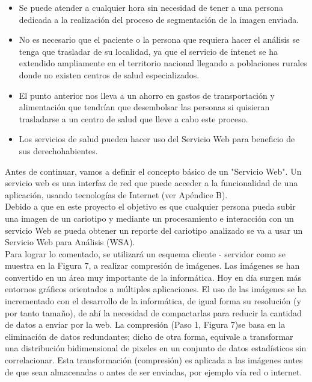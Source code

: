 \documentclass[12pt,letterpaper,titlepage]{article}
\begin{document}
\begin{itemize}
\begin{itemize}\itemsep=0pt
\item  Se puede atender a cualquier hora sin necesidad de tener a una persona dedicada a la realización del proceso de segmentación de la imagen enviada.\\
\item No es necesario que el paciente o la persona que requiera hacer el análisis se tenga que trasladar de su localidad, ya que el servicio de intenet se ha extendido 
ampliamente en el territorio nacional llegando a poblaciones rurales donde no existen centros de salud especializados.\\
\item El punto anterior nos lleva a un ahorro en gastos de transportación y alimentación que tendrían que desembolsar las personas si quisieran trasladarse a un centro de salud que lleve a cabo este proceso.\\
\item Los servicios de salud pueden hacer uso del Servicio Web para beneficio de sus derechohabientes.\\
\end{itemize}

Antes de continuar, vamos a definir el concepto básico de un "Servicio Web". Un servicio web es una interfaz de red que puede acceder a la funcionalidad de una aplicación, usando tecnologías de Internet (ver Apéndice B). \\ %



Debido a que en este proyecto el objetivo es que cualquier persona pueda subir una imagen de un cariotipo y mediante un procesamiento e interacción con un servicio Web se pueda obtener un reporte del cariotipo analizado se va a usar un Servicio Web para Análisis (WSA).\\

Para lograr lo comentado, se utilizará un esquema cliente - servidor como se muestra en la Figura 7, a realizar compresión de imágenes. Las imágenes se han convertido en un área muy importante de la informática. Hoy en día surgen más entornos gráficos orientados a múltiples aplicaciones. El uso de las imágenes se ha incrementado con el desarrollo de la informática, de igual forma su resolución (y por tanto tamaño), de ahí la necesidad de compactarlas para reducir la cantidad de datos a enviar por la web. La compresión (Paso 1, Figura 7)se basa en la eliminación de datos redundantes; dicho de otra forma, equivale a transformar una distribución bidimensional de pixeles en un conjunto de datos estadísticos sin correlacionar. Esta transformación (compresión) es aplicada a las imágenes antes de que sean almacenadas o antes de ser enviadas, por ejemplo vía red o internet. \\


\end{itemize}
\end{document}
